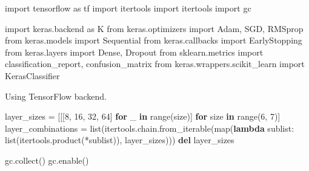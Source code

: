 \documentclass[]{article}
\newenvironment{Shaded}{}{}
\newcommand{\BuiltInTok}[1]{#1}
\newcommand{\ControlFlowTok}[1]{\textcolor[rgb]{0.00,0.44,0.13}{\textbf{#1}}}
\newcommand{\DecValTok}[1]{\textcolor[rgb]{0.25,0.63,0.44}{#1}}
\newcommand{\ImportTok}[1]{#1}
\newcommand{\KeywordTok}[1]{\textcolor[rgb]{0.00,0.44,0.13}{\textbf{#1}}}
\newcommand{\NormalTok}[1]{#1}
\newcommand{\OperatorTok}[1]{\textcolor[rgb]{0.40,0.40,0.40}{#1}}
\begin{document}
\begin{Shaded}
\begin{Highlighting}[]
\ImportTok{import}\NormalTok{ tensorflow }\ImportTok{as}\NormalTok{ tf}
\ImportTok{import}\NormalTok{ itertools}
\ImportTok{import}\NormalTok{ itertools}
\ImportTok{import}\NormalTok{ gc}

\ImportTok{import}\NormalTok{ keras.backend }\ImportTok{as}\NormalTok{ K}
\ImportTok{from}\NormalTok{ keras.optimizers }\ImportTok{import}\NormalTok{ Adam, SGD, RMSprop}
\ImportTok{from}\NormalTok{ keras.models }\ImportTok{import}\NormalTok{ Sequential}
\ImportTok{from}\NormalTok{ keras.callbacks }\ImportTok{import}\NormalTok{ EarlyStopping}
\ImportTok{from}\NormalTok{ keras.layers }\ImportTok{import}\NormalTok{ Dense, Dropout}
\ImportTok{from}\NormalTok{ sklearn.metrics }\ImportTok{import}\NormalTok{ classification_report, confusion_matrix}
\ImportTok{from}\NormalTok{ keras.wrappers.scikit_learn }\ImportTok{import}\NormalTok{ KerasClassifier}
\end{Highlighting}
\end{Shaded}

Using TensorFlow backend.

\begin{Shaded}
\begin{Highlighting}[]
\NormalTok{layer_sizes }\OperatorTok{=}\NormalTok{ [[[}\DecValTok{8}\NormalTok{, }\DecValTok{16}\NormalTok{, }\DecValTok{32}\NormalTok{, }\DecValTok{64}\NormalTok{] }\ControlFlowTok{for}\NormalTok{ _ }\KeywordTok{in} \BuiltInTok{range}\NormalTok{(size)] }\ControlFlowTok{for}\NormalTok{ size }\KeywordTok{in} \BuiltInTok{range}\NormalTok{(}\DecValTok{6}\NormalTok{, }\DecValTok{7}\NormalTok{)]}
\NormalTok{layer_combinations }\OperatorTok{=} \BuiltInTok{list}\NormalTok{(itertools.chain.from_iterable(}\BuiltInTok{map}\NormalTok{(}\KeywordTok{lambda}\NormalTok{ sublist: }\BuiltInTok{list}\NormalTok{(itertools.product(}\OperatorTok{*}\NormalTok{sublist)), layer_sizes)))}
\KeywordTok{del}\NormalTok{ layer_sizes}

\NormalTok{gc.collect()}
\NormalTok{gc.enable()}
\end{Highlighting}
\end{Shaded}
\end{document}
